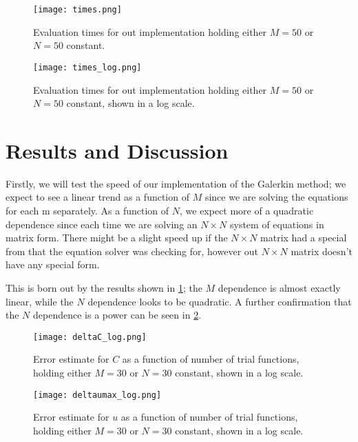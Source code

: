 \documentclass[10pt,a4paper,twocolumn]{article}
\begin{document}
\begin{figure}
    \centering
    \captionsetup{justification=centering}
    \texttt{[image: times.png]}
    \caption{Evaluation times for out implementation holding either $M = 50$ or $N = 50$ constant.}
    \label{fig:times}
\end{figure}

\begin{figure}
    \centering
    \captionsetup{justification=centering}
    \texttt{[image: times\_log.png]}
    \caption{Evaluation times for out implementation holding either $M = 50$ or $N = 50$ constant, shown in a log scale.}
    \label{fig:times_log}
\end{figure}

\section{Results and Discussion}

Firstly,  we will test the speed of our implementation of the Galerkin method; we expect to see a linear trend as a function of $M$ since we are solving the equations for each m separately. As a function of $N$, we expect more of a quadratic dependence since each time we are solving an $N \times N$ system of equations in matrix form. There might be a slight speed up if the $N \times N$ matrix had a special from that the equation solver was checking for, however out $N \times N$ matrix doesn't have any special form.

This is born out by the results shown in \cref{fig:times}; the $M$ dependence is almost exactly linear, while the $N$ dependence looks to be quadratic. A further confirmation that the $N$ dependence is a power can be seen in \cref{fig:times_log}.


\begin{figure}
    \centering
    \captionsetup{justification=centering}
    \texttt{[image: deltaC\_log.png]}
    \caption{Error estimate for $C$ as a function of number of trial functions, holding either $M = 30$ or $N = 30$ constant, shown in a log scale.}
    \label{fig:deltaC_log}
\end{figure}

\begin{figure}
    \centering
    \captionsetup{justification=centering}
    \texttt{[image: deltaumax\_log.png]}
    \caption{Error estimate for $u$ as a function of number of trial functions, holding either $M = 30$ or $N = 30$ constant, shown in a log scale.}
    \label{fig:deltaumax_log}
\end{figure}
\end{document}
